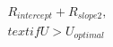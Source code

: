 \documentclass[preview]{standalone}
\begin{document}
\begin{align*}
R_{intercept} + R_{slope2}, & \\text{if } U > U_{optimal}
\end{align*}
\end{document}
